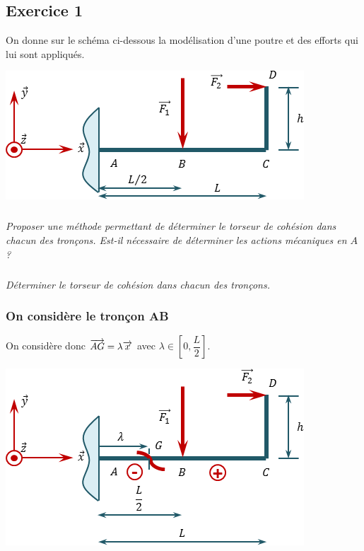 \documentclass[10pt,fleqn]{article} %
\begin{document}

\vspace{7cm}
\pagestyle{fancy}
\thispagestyle{plain}


\def\columnseprulecolor{\color{ocre}}
\setlength{\columnseprule}{0.4pt} 
\ifprof
\else
\begin{multicols}{2}
\fi

\section*{Exercice 1}
\setcounter{subparagraph}{0}
On donne sur le schéma ci-dessous la modélisation d'une poutre et des efforts qui lui sont appliqués.
\begin{center}
\includegraphics[width=.45\textwidth]{images/exo_08}
\end{center}

\subparagraph{}
\textit{Proposer une méthode permettant de déterminer le torseur de cohésion dans chacun des tronçons. Est-il nécessaire de déterminer les actions mécaniques en $A$ ?}

\subparagraph{}
\textit{Déterminer le torseur de cohésion dans chacun des tronçons.}


\ifprof
\begin{corrige}
\subsubsection*{On considère le tronçon AB}
On considère donc $\overrightarrow{AG} = \lambda \overrightarrow{x}$ avec $\lambda\in \left[0,\dfrac{L}{2}\right]$.
\begin{center}
\includegraphics[width=.45\textwidth]{images/exo_08_corr_01}
\end{center}



\end{corrige}
\end{multicols}
\end{document}
